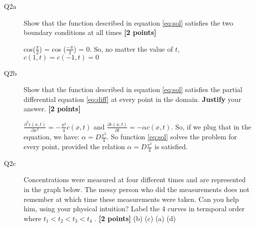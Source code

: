 \documentclass{article}
\newcommand{\ans}[1]{\textcolor{dark-green}{#1}}
\begin{document}
\begin{description}
\item [Q2a] Show that the function described in equation \ref{eq:sol} satisfies the two boundary conditions at all times \textbf{[2 points]}

\ans{cos($\frac{\pi}{2}$) = cos ($\frac{-\pi}{2}$) = 0. So, no matter the value of $t$, $c(1,t) = c(-1,t) = 0$}

\item [Q2b] Show that the function described in equation \ref{eq:sol} satisfies the partial differential equation \ref{eq:diff} at every point in the domain. \textbf{Justify} your answer. \textbf{[2 points]}

\ans{$\frac{\partial^2 c(x,t)}{\partial x^2} = - \frac{\pi^2}{4}c(x,t)$ and $\frac{\partial c(x,t)}{\partial t} = - \alpha c(x,t)$. So, if we plug that in the equation, we have: $ \alpha = D \frac{\pi^2}{4}$. So function \ref{eq:sol} solves the problem for every point, provided the relation $ \alpha = D \frac{\pi^2}{4}$ is satisfied. }





\item [Q2c] Concentrations were measured at four different times and are represented in the graph below. The messy person who did the measurements does not remember at which time these measurements were taken. Can you help him, using your physical intuition? Label the 4 curves in termporal order where $t_1< t_2<t_3<t_4$ .  \textbf{[2 points]}
\ans{(b) (c) (a) (d)}
\end{description}

\end{document}
